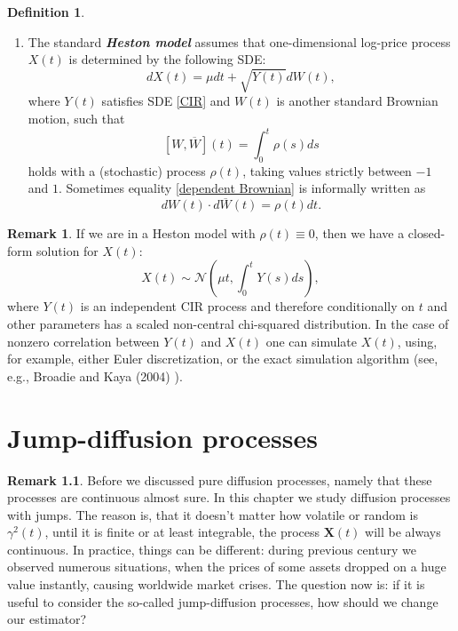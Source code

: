 \documentclass[a4paper,11pt]{book}
\theoremstyle{plain}
\theoremstyle{definition}
\newtheorem{defn}[thm]{Definition}
\newtheorem{rmrk}[thm]{Remark}
\newcommand{\define}[1]{\textit{\textbf{#1}}}
\begin{document}
\begin{defn}
\begin{enumerate}
    		\item The standard \define{Heston model} assumes that one-dimensional log-price process $X(t)$ is determined by the following SDE:
    		\begin{equation}
    		dX(t) = \mu dt + \sqrt{Y(t)}d{W}(t),
    		\end{equation}
    		where $Y(t)$ satisfies SDE \eqref{CIR} and ${W}(t)$ is another standard Brownian motion, such that 
    		\begin{equation} \label{dependent Brownian}
    		[{W}, \overline{W}](t) = \int_{0}^{t}\rho(s) ds
    		\end{equation}
    		holds with a (stochastic) process $\rho(t)$, taking values strictly between $-1$ and $1$. Sometimes equality \eqref{dependent Brownian} is informally written as
    		\[ d{W}(t)\cdot d\overline{W}(t) = \rho(t) dt. \]
    	\end{enumerate}
    \end{defn}
    
    \begin{rmrk}
    	If we are in a Heston model with $\rho(t) \equiv 0$, then we have a closed-form solution for $X(t)$:
    	\[ X(t) \sim \mathcal{N}(\mu t, \int_0^t Y(s) ds ), \]
    	where $Y(t)$ is an independent CIR process and therefore conditionally on $t$ and other parameters has a scaled non-central chi-squared distribution. In the case of nonzero correlation between $Y(t)$ and $X(t)$ one can simulate $X(t)$, using, for example, either Euler discretization, or the exact simulation algorithm (see, e.g., Broadie and Kaya (2004) \cite{Broadie}).
    \end{rmrk}
    
    
    \chapter{Jump-diffusion processes}
    \begin{rmrk}
    	Before we discussed pure diffusion processes, namely that these processes are continuous almost sure. In this chapter we study diffusion processes with jumps. The reason is, that it doesn't matter how volatile or random is $\gamma^2(t)$, until it is finite or at least integrable, the process $\mathbf{X}(t)$ will be always continuous. In practice, things can be different: during previous century we observed numerous situations, when the prices of some assets dropped on a huge value instantly, causing worldwide market crises. The question now is: if it is useful to consider the so-called jump-diffusion processes, how should we change our estimator?
    \end{rmrk}
    
\end{document}
